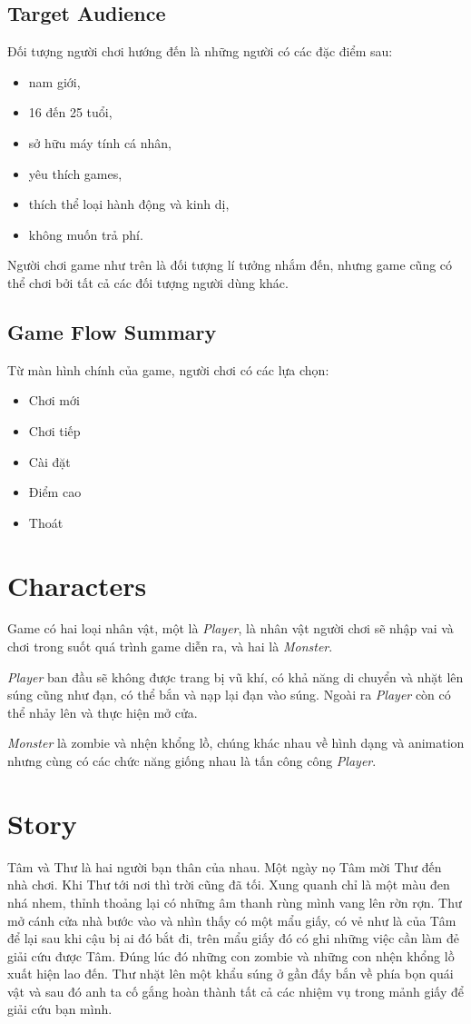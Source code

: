 \documentclass[14pt,a4paper]{extreport}
\begin{document}
\section{Target Audience}
Đối tượng người chơi hướng đến là những người có các đặc điểm sau:
\begin{itemize}
	\item nam giới,
	\item 16 đến 25 tuổi,
	\item sở hữu máy tính cá nhân,
	\item yêu thích games,
	\item thích thể loại hành động và kinh dị,
	\item không muốn trả phí.
\end{itemize}

Người chơi game như trên là đối tượng lí tưởng nhắm đến, nhưng game cũng có thể chơi bởi tất cả các đối tượng người dùng khác.


\section{Game Flow Summary}
Từ màn hình chính của game, người chơi có các lựa chọn:
\begin{itemize}
	\item Chơi mới
	\item Chơi tiếp
	\item Cài đặt
	\item Điểm cao
	\item Thoát
\end{itemize}


\chapter{Characters}
Game có hai loại nhân vật, một là \textit{Player}, là nhân vật người chơi sẽ nhập vai và chơi trong suốt quá trình game diễn ra, và hai là \textit{Monster}. 

\textit{Player} ban đầu sẽ không được trang bị vũ khí, có khả năng di chuyển và nhặt lên súng cũng như đạn, có thể bắn và nạp lại đạn vào súng. Ngoài ra \textit{Player} còn có thể nhảy lên và thực hiện mở cửa. 

\textit{Monster} là zombie và nhện khổng lồ, chúng khác nhau về hình dạng và animation nhưng cùng có các chức năng giống nhau là tấn công công \textit{Player}.

\chapter{Story}
Tâm và Thư là hai người bạn thân của nhau. Một ngày nọ Tâm mời Thư đến nhà chơi. Khi Thư tới nơi thì trời cũng đã tối. Xung quanh chỉ là một màu đen nhá nhem, thỉnh thoảng lại có những âm thanh rùng mình vang lên rờn rợn. Thư mở cánh cửa nhà bước vào và nhìn thấy có một mẩu giấy, có vẻ như là của Tâm để lại sau khi cậu bị ai đó bắt đi, trên mẩu giấy đó có ghi những việc cần làm đẻ giải cứu được Tâm. Đúng lúc đó những con zombie và những con nhện khổng lồ xuất hiện lao đến. Thư nhặt lên một khẩu súng ở gần đấy bắn về phía bọn quái vật và sau đó anh ta cố gắng hoàn thành tất cả các nhiệm vụ trong mảnh giấy để giải cứu bạn mình.
\end{document}
